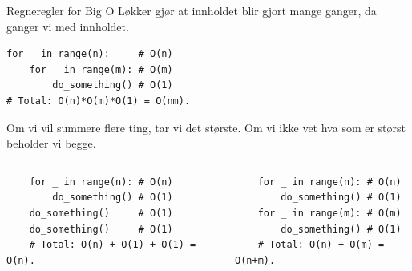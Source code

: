 \begin{frame}[fragile]{Regneregler for Big O}
    Løkker gjør at innholdet blir gjort mange ganger, da ganger vi med innholdet.
    \begin{verbatim}
for _ in range(n):     # O(n)
    for _ in range(m): # O(m)
        do_something() # O(1)
# Total: O(n)*O(m)*O(1) = O(nm).
    \end{verbatim}
    \pause
    Om vi vil summere flere ting, tar vi det største. Om vi ikke vet hva som er størst beholder vi begge.  
    \begin{columns}
        \begin{column}{0.45\textwidth}
            \begin{verbatim}
    for _ in range(n): # O(n)
        do_something() # O(1)
    do_something()     # O(1)
    do_something()     # O(1)
    # Total: O(n) + O(1) + O(1) = O(n).  
            \end{verbatim}
        \end{column}
        \pause
        \begin{column}{0.45\textwidth}
            \begin{verbatim}
    for _ in range(n): # O(n)
        do_something() # O(1)
    for _ in range(m): # O(m)
        do_something() # O(1)
    # Total: O(n) + O(m) = O(n+m).
            \end{verbatim}
            
        \end{column}
    \end{columns}
\end{frame}